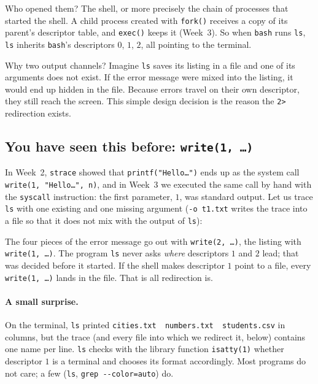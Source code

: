 \documentclass[11pt,a4paper]{article}
\newcommand{\cmd}[1]{\texttt{#1}}
\begin{document}
Who opened them? The shell, or more precisely the chain of processes that started the shell. A child process created with \cmd{fork()} receives a copy of its parent's descriptor table, and \cmd{exec()} keeps it (Week~3). So when \cmd{bash} runs \cmd{ls}, \cmd{ls} inherits \cmd{bash}'s descriptors $0$, $1$, $2$, all pointing to the terminal.

Why two output channels? Imagine \cmd{ls} saves its listing in a file and one of its arguments does not exist. If the error message were mixed into the listing, it would end up hidden in the file. Because errors travel on their own descriptor, they still reach the screen. This simple design decision is the reason the \cmd{2>} redirection exists.

\subsection{You have seen this before: \texttt{write(1, \dots)}}

In Week~2, \cmd{strace} showed that \cmd{printf("Hello\dots")} ends up as the system call \cmd{write(1, "Hello\dots", n)}, and in Week~3 we executed the same call by hand with the \texttt{syscall} instruction: the first parameter, $1$, was standard output. Let us trace \cmd{ls} with one existing and one missing argument (\cmd{-o t1.txt} writes the trace into a file so that it does not mix with the output of \cmd{ls}):



The four pieces of the error message go out with \cmd{write(2, \dots)}, the listing with \cmd{write(1, \dots)}. The program \cmd{ls} never asks \emph{where} descriptors $1$ and $2$ lead; that was decided before it started. If the shell makes descriptor $1$ point to a file, every \cmd{write(1, \dots)} lands in the file. That is all redirection is.

\paragraph{A small surprise.} On the terminal, \cmd{ls} printed \texttt{cities.txt\ \ numbers.txt\ \ students.csv} in columns, but the trace (and every file into which we redirect it, below) contains one name per line. \cmd{ls} checks with the library function \cmd{isatty(1)} whether descriptor $1$ is a terminal and chooses its format accordingly. Most programs do not care; a few (\cmd{ls}, \cmd{grep -{}-color=auto}) do.
\end{document}
